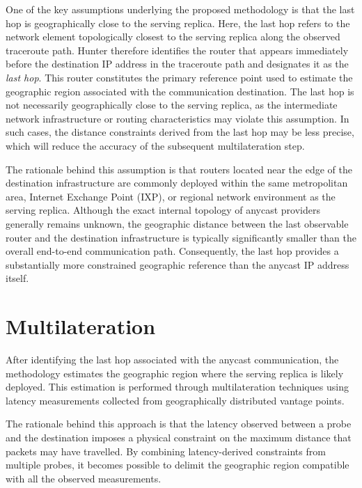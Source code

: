 \documentclass[
A4paper,                %
twoside,                %
openright,              %
chapterprefix=true,     %
12pt,                   %
headings=normal,        %
titlepage=on            %
]{book}
\begin{document}
One of the key assumptions underlying the proposed methodology is that the last hop is geographically close to the serving replica. Here, the last hop refers to the network element topologically closest to the serving replica along the observed traceroute path. Hunter therefore identifies the router that appears immediately before the destination IP address in the traceroute path and designates it as the \textit{last hop}. This router constitutes the primary reference point used to estimate the geographic region associated with the communication destination. The last hop is not necessarily geographically close to the serving replica, as the intermediate network infrastructure or routing characteristics may violate this assumption. In such cases, the distance constraints derived from the last hop may be less precise, which will reduce the accuracy of the subsequent multilateration step.

The rationale behind this assumption is that routers located near the edge of the destination infrastructure are commonly deployed within the same metropolitan area, Internet Exchange Point (IXP), or regional network environment as the serving replica. Although the exact internal topology of anycast providers generally remains unknown, the geographic distance between the last observable router and the destination infrastructure is typically significantly smaller than the overall end-to-end communication path. Consequently, the last hop provides a substantially more constrained geographic reference than the anycast IP address itself.

\section{Multilateration}
\label{sc:hunter_multilateration}

After identifying the last hop associated with the anycast communication, the methodology estimates the geographic region where the serving replica is likely deployed. This estimation is performed through multilateration techniques using latency measurements collected from geographically distributed vantage points.

The rationale behind this approach is that the latency observed between a probe and the destination imposes a physical constraint on the maximum distance that packets may have travelled. By combining latency-derived constraints from multiple probes, it becomes possible to delimit the geographic region compatible with all the observed measurements\cite{Cicalese2016Latency-BasedSets}.
\end{document}
